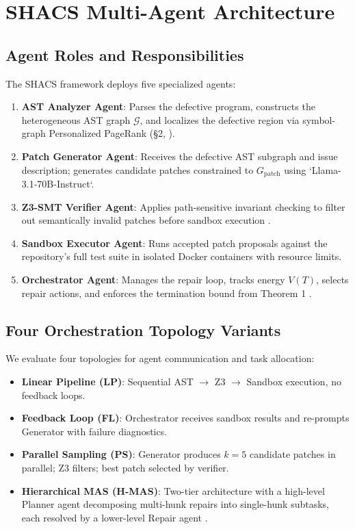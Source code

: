 \documentclass{article}
\begin{document}
\section{SHACS Multi-Agent Architecture}



\subsection{Agent Roles and Responsibilities}


The SHACS framework deploys five specialized agents:

\begin{enumerate}
  \item \textbf{AST Analyzer Agent}: Parses the defective program, constructs the heterogeneous AST graph $\mathcal{G}$, and localizes the defective region via symbol-graph Personalized PageRank (\S{}2, \cite{crossref_10_1145_3689096_3689462}).
  \item \textbf{Patch Generator Agent}: Receives the defective AST subgraph and issue description; generates candidate patches constrained to $G_{\text{patch}}$ using `Llama-3.1-70B-Instruct`.
  \item \textbf{Z3-SMT Verifier Agent}: Applies path-sensitive invariant checking to filter out semantically invalid patches before sandbox execution \cite{arxiv_2404_01131}.
  \item \textbf{Sandbox Executor Agent}: Runs accepted patch proposals against the repository's full test suite in isolated Docker containers with resource limits.
  \item \textbf{Orchestrator Agent}: Manages the repair loop, tracks energy $V(T)$, selects repair actions, and enforces the termination bound from Theorem 1 \cite{arxiv_2412_06333}.
\end{enumerate}


\subsection{Four Orchestration Topology Variants}


We evaluate four topologies for agent communication and task allocation:

\begin{itemize}
  \item \textbf{Linear Pipeline (LP)}: Sequential AST $\rightarrow$ Z3 $\rightarrow$ Sandbox execution, no feedback loops.
  \item \textbf{Feedback Loop (FL)}: Orchestrator receives sandbox results and re-prompts Generator with failure diagnostics.
  \item \textbf{Parallel Sampling (PS)}: Generator produces $k = 5$ candidate patches in parallel; Z3 filters; best patch selected by verifier.
  \item \textbf{Hierarchical MAS (H-MAS)}: Two-tier architecture with a high-level Planner agent decomposing multi-hunk repairs into single-hunk subtasks, each resolved by a lower-level Repair agent \cite{arxiv_2412_06333}.
\end{itemize}
\end{document}
